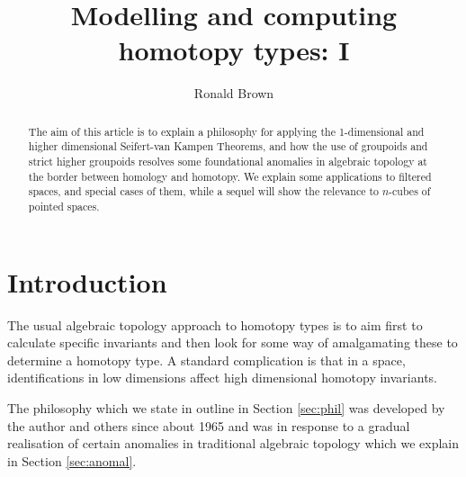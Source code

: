 \documentclass{elsarticle}
\begin{document}
\begin{frontmatter}
 \title{Modelling and computing homotopy types: I }

  \author{Ronald Brown}
  \address{School of Computer Science, Bangor University}

  \begin{abstract}
The aim of this article is to explain a philosophy for applying the 1-dimensional  and higher dimensional Seifert-van Kampen Theorems, and how the use of groupoids and strict higher groupoids resolves some foundational anomalies in  algebraic topology at the border between homology and homotopy. We   explain some applications to filtered spaces, and special cases of them, while a  sequel  will show the relevance to $n$-cubes of pointed spaces.
\end{abstract}
\begin{keyword}
\end{keyword}

\end{frontmatter}








\preprintfalse
\tableofcontents

\section*{Introduction}\label{sec:intro}
The usual algebraic topology approach to homotopy types is to aim first to calculate specific invariants and then look for some way of amalgamating these to determine a homotopy type. A standard complication is that in a space, identifications in low dimensions affect high dimensional homotopy invariants.

The philosophy which we state in outline in Section \ref{sec:phil} was developed by the author and others since about 1965 and was in response to a gradual realisation of certain anomalies in traditional algebraic topology which we explain in Section \ref{sec:anomal}.
\end{document}
